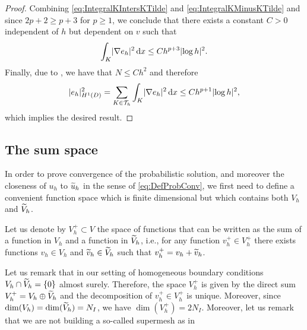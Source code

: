 \documentclass[10pt]{article}
\begin{document}
\begin{proof}
	Combining \eqref{eq:IntegralKIntersKTilde} and \eqref{eq:IntegralKMinusKTilde} and since $2p+2\geq p+3$ for $p \geq 1$, we conclude that there exists a constant $C > 0$ independent of $h$ but dependent on $v$ such that
	\begin{equation}
		\int_K \lvert\nabla  e_h\rvert^2 \, \mathrm{d} x \leq Ch^{p+3}\lvert\log h\rvert^2.
	\end{equation}
	Finally, due to , we have that $N \leq Ch^2$ and therefore
	\begin{equation}
		\lvert e_h\rvert_{H^1(D)}^2 = \sum_{K \in \mathcal T_h} \int_K \lvert\nabla  e_h\rvert^2 \, \mathrm{d} x \leq Ch^{p+1}\lvert\log h\rvert^2,
	\end{equation}
	which implies the desired result.
\end{proof}

\subsection{The sum space}

In order to prove convergence of the probabilistic solution, and moreover the closeness of $u_h$ to $\widetilde u_h$ in the sense of \eqref{eq:DefProbConv}, we first need to define a convenient function space which is finite dimensional but which contains both $V_h$ and $\widetilde V_h$. 

\begin{definition} Let us denote by $V_h^+ \subset V$  the space of functions that can be written as the sum of a function in $V_h$ and a function in $\widetilde V_h$, i.e., for any function $v_h^+ \in V_h^+$ there exists functions $v_h \in V_h$ and $\widetilde v_h \in \widetilde V_h$ such that $v_h^+ = v_h + \widetilde v_h$. 
\end{definition}

\begin{remark} Let us remark that in our setting of homogeneous boundary conditions $V_h \cap \widetilde V_h = \{0\}$ almost surely. Therefore, the space $V_h^+$ is given by the direct sum $V_h^+ = V_h \oplus \widetilde V_h$ and the decomposition of $v_h^+ \in V_h^+$ is unique. Moreover, since $\dim(V_h) = \dim(\widetilde V_h) = N_I$, we have $\dim(V_h^+) = 2N_I$. Moreover, let us remark that we are not building a so-called supermesh as in \cite{FPP09,FaM11, CGR18}
\end{remark}
\end{document}
